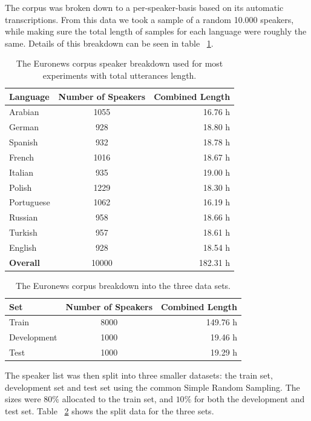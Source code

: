 The corpus was broken down to a per-speaker-basis based on its automatic transcriptions. From this data we took a sample of a random 10.000 speakers, while making sure the total length of samples for each language were roughly the same. Details of this breakdown can be seen in table ~\ref{tab:spkData}.

\begin{table}[h!]
\caption{The Euronews corpus speaker breakdown used for most experiments with total utterances length.}
\label{tab:spkData}
\centering
\begin{tabular}{| l | c | r | }
	\hline
	\textbf{Language} & \textbf{Number of Speakers} & \textbf{Combined Length} \\
	\hline
	Arabian & 1055 & 16.76 h \\
	German & 928 & 18.80 h \\
	Spanish & 932 & 18.78 h \\
	French & 1016 & 18.67 h \\  
	Italian & 935 & 19.00 h \\  
	Polish & 1229 & 18.30 h \\ 
	Portuguese & 1062 & 16.19 h \\ 
	Russian & 958 & 18.66 h \\ 
	Turkish & 957 & 18.61 h \\  
	English & 928 & 18.54 h \\ 
	\hline
	\textbf{Overall} & 10000 & 182.31 h\\
	\hline	
\end{tabular}
\end{table}

\begin{table}[h!]
\caption{The Euronews corpus breakdown into the three data sets.}
\label{tab:spkSplit}
\centering
\begin{tabular}{| l | c | r | }
	\hline
	\textbf{Set} & \textbf{Number of Speakers} & \textbf{Combined Length} \\
	\hline
	Train &  8000 & 149.76 h \\
	Development & 1000 & 19.46 h \\
	Test & 1000 & 19.29 h \\
	\hline
\end{tabular}
\end{table}

The speaker list was then split into three smaller datasets: the train set, development set and test set using the common Simple Random Sampling. The sizes were \(80\%\) allocated to the train set, and \(10\%\) for both the development and test set. Table ~\ref{tab:spkSplit} shows the split data for the three sets. 

